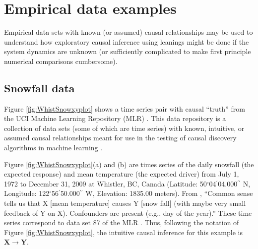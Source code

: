 \section{Empirical data examples}
\label{sec:emp}
Empirical data sets with known (or assumed) causal relationships may be used to understand how exploratory causal inference using leanings might be done if the system dynamics are unknown (or sufficiently complicated to make first principle numerical comparisons cumbersome).

\subsection{Snowfall data}
Figure \ref{fig:WhistSnowxyplot} shows a time series pair with causal ``truth'' from the UCI Machine Learning Repository (MLR) \cite{bache2013}.  This data repository is a collection of data sets (some of which are time series) with known, intuitive, or assumed causal relationships meant for use in the testing of causal discovery algorithms in machine learning \cite{bache2013}.

Figure \ref{fig:WhistSnowxyplot}(a) and (b)  are times series of the daily snowfall (the expected response) and mean temperature (the expected driver) from July 1, 1972 to December 31, 2009 at Whistler, BC, Canada (Latitude: 50$^\circ$04$^\prime$04.000$^{\prime\prime}$ N, Longitude: 122$^\circ$56$^\prime$50.000$^{\prime\prime}$ W, Elevation: 1835.00 meters).  From \cite{bache2013}, ``Common sense tells us that X [mean temperature] causes Y [snow fall] (with maybe very small feedback of Y on X). Confounders are present (e.g., day of the year).''  These time series correspond to data set 87 of the MLR \cite{bache2013}.  Thus, following the notation of Figure \ref{fig:WhistSnowxyplot}, the intuitive causal inference for this example is $\mathbf{X}\rightarrow\mathbf{Y}$. 

